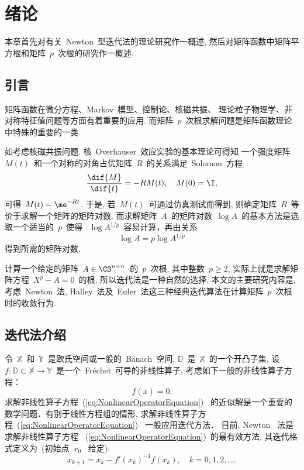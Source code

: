 

\chapter{绪论}
\label{chapter:Introduction}


本章首先对有关~Newton~型迭代法的理论研究作一概述,
然后对矩阵函数中矩阵平方根和矩阵~$p$~次根的研究作一概述.

\section{引言}


矩阵函数在微分方程、Markov~模型、控制论、核磁共振、
理论粒子物理学、非对称特征值问题等方面有着重要的应用.
而矩阵~$p$~次根求解问题是矩阵函数理论中特殊的重要的一类.

如考虑核磁共振问题. 核~Overhauser~效应实验的基本理论可得知
一个强度矩阵~$M(t)$~和一个对称的对角占优矩阵~$R$~的关系满足~Solomon~方程
$$
\frac{\dif{M}}{\dif{t}} = - R M(t), \quad M(0) = \I,
$$
可得~$M(t) = \me^{-Rt}$. 于是, 若~$M(t)$~可通过仿真测试而得到,
则确定矩阵~$R$~等价于求解一个矩阵的矩阵对数.
而求解矩阵~$A$~的矩阵对数~$\log{A}$~的基本方法是选取一个适当的~$p$~使得
~$\log{A^{1/p}}$~容易计算，再由关系
$$
\log{A} = p \log{A^{1/p}}
$$
得到所需的矩阵对数.

计算一个给定的矩阵~$A\in \CS^{n\times n}$~的~$p$~次根,
其中整数~$p\geq2$, 实际上就是求解矩阵方程~$X^p - A = 0$~的根.
所以迭代法是一种自然的选择. 本文的主要研究内容是, 考虑~Newton~法,
Halley~法及~Euler~法这三种经典迭代算法在计算矩阵~$p$~次根时的收敛行为.





\section{迭代法介绍}

令~$\mathbb{X}$~和~$\mathbb{Y}$~是欧氏空间或一般的~Banach~空间,
$\mathbb{D}$~是~$\mathbb{X}$~的一个开凸子集, 设~$f:\mathbb{D}
\subset \mathbb{X} \to
\mathbb{Y}$~是一个~Fr\'{e}chet~可导的非线性算子,
考虑如下一般的非线性算子方程：
\begin{equation}
\label{eq:NonlinearOperatorEquation} f(x) = 0.
\end{equation}
求解非线性算子方程~(\ref{eq:NonlinearOperatorEquation})~
的近似解是一个重要的数学问题．有别于线性方程组的情形,
求解非线性算子方程~(\ref{eq:NonlinearOperatorEquation})~
一般应用迭代方法． 目前,  Newton~ 法是求解非线性算子方程
~(\ref{eq:NonlinearOperatorEquation})~的最有效方法,
其迭代格式定义为~(初始点~$x_0$~ 给定):
\begin{equation}
\label{it:NM_BanachSpace} x_{k+1} = x_k - f'(x_k)^{-1}f(x_k),\quad k
= 0,1,2,\ldots.
\end{equation}

